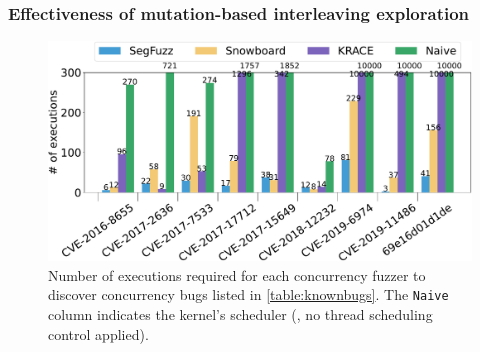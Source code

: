 %




%






\subsubsection{Effectiveness of mutation-based interleaving
  exploration}
\label{sss:interleavingsearch}
%
%
%   

\begin{figure}[t]
  \centering
  \includegraphics[width=0.99\linewidth]{fig/comparison_graph_execution-crop.pdf}
  \caption{Number of executions required for each concurrency fuzzer
    to discover concurrency bugs listed in
    \autoref{table:knownbugs}. The \texttt{Naive} column indicates the
    kernel's scheduler (\ie, no thread scheduling control applied).}
  \label{fig:eval:comparison-execution}
  \vspace{-8pt}
\end{figure}

